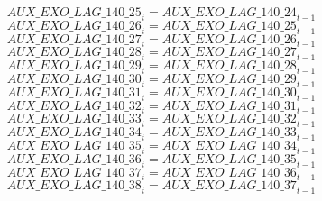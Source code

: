 \begin{dmath}
{AUX\_EXO\_LAG\_140\_25}_{t}={AUX\_EXO\_LAG\_140\_24}_{t-1}
\end{dmath}
\begin{dmath}
{AUX\_EXO\_LAG\_140\_26}_{t}={AUX\_EXO\_LAG\_140\_25}_{t-1}
\end{dmath}
\begin{dmath}
{AUX\_EXO\_LAG\_140\_27}_{t}={AUX\_EXO\_LAG\_140\_26}_{t-1}
\end{dmath}
\begin{dmath}
{AUX\_EXO\_LAG\_140\_28}_{t}={AUX\_EXO\_LAG\_140\_27}_{t-1}
\end{dmath}
\begin{dmath}
{AUX\_EXO\_LAG\_140\_29}_{t}={AUX\_EXO\_LAG\_140\_28}_{t-1}
\end{dmath}
\begin{dmath}
{AUX\_EXO\_LAG\_140\_30}_{t}={AUX\_EXO\_LAG\_140\_29}_{t-1}
\end{dmath}
\begin{dmath}
{AUX\_EXO\_LAG\_140\_31}_{t}={AUX\_EXO\_LAG\_140\_30}_{t-1}
\end{dmath}
\begin{dmath}
{AUX\_EXO\_LAG\_140\_32}_{t}={AUX\_EXO\_LAG\_140\_31}_{t-1}
\end{dmath}
\begin{dmath}
{AUX\_EXO\_LAG\_140\_33}_{t}={AUX\_EXO\_LAG\_140\_32}_{t-1}
\end{dmath}
\begin{dmath}
{AUX\_EXO\_LAG\_140\_34}_{t}={AUX\_EXO\_LAG\_140\_33}_{t-1}
\end{dmath}
\begin{dmath}
{AUX\_EXO\_LAG\_140\_35}_{t}={AUX\_EXO\_LAG\_140\_34}_{t-1}
\end{dmath}
\begin{dmath}
{AUX\_EXO\_LAG\_140\_36}_{t}={AUX\_EXO\_LAG\_140\_35}_{t-1}
\end{dmath}
\begin{dmath}
{AUX\_EXO\_LAG\_140\_37}_{t}={AUX\_EXO\_LAG\_140\_36}_{t-1}
\end{dmath}
\begin{dmath}
{AUX\_EXO\_LAG\_140\_38}_{t}={AUX\_EXO\_LAG\_140\_37}_{t-1}
\end{dmath}
